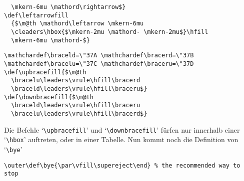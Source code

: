 \begin{appendix}
\begin{verbatim}
  \mkern-6mu \mathord\rightarrow$}
\def\leftarrowfill
  {$\m@th \mathord\leftarrow \mkern-6mu
  \cleaders\hbox{$\mkern-2mu \mathord- \mkern-2mu$}\hfill
  \mkern-6mu \mathord-$}
\end{verbatim}
\begin{verbatim}
\mathchardef\braceld=\"37A \mathchardef\bracerd=\"37B
\mathchardef\bracelu=\"37C \mathchardef\braceru=\"37D
\def\upbracefill{$\m@th
  \bracelu\leaders\vrule\hfill\bracerd
  \braceld\leaders\vrule\hfill\braceru$}
\def\downbracefill{$\m@th
  \braceld\leaders\vrule\hfill\braceru
  \bracelu\leaders\vrule\hfill\bracerd$}
\end{verbatim}
Die Befehle `\verb|\upbracefill|' und `\verb|\downbracefill|' f\"urfen
nur innerhalb einer `\verb|\hbox|' auftreten, oder in einer Tabelle.
Nun kommt noch die Definition von `\verb|\bye|'
\begin{verbatim}
\outer\def\bye{\par\vfill\supereject\end} % the recommended way to stop
\end{verbatim}

\end{appendix}
